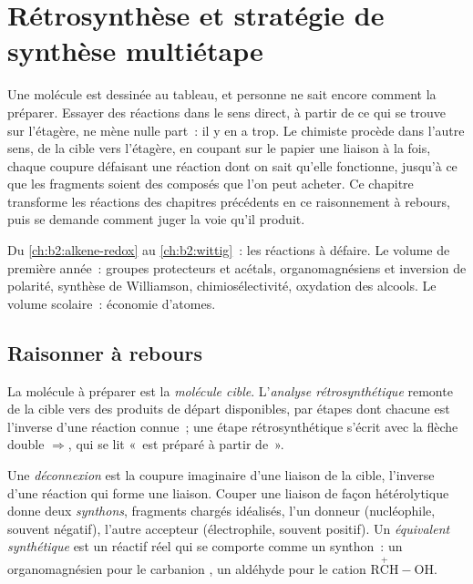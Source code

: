\chapter{Rétrosynthèse et stratégie de synthèse multiétape}\label{ch:b2:retrosynthesis}

Une molécule est dessinée au tableau, et personne ne sait encore comment la préparer. Essayer des
réactions dans le sens direct, à partir de ce qui se trouve sur l'étagère, ne mène nulle part~: il y en
a trop. Le chimiste procède dans l'autre sens, de la cible vers l'étagère, en coupant sur le papier une
liaison à la fois, chaque coupure défaisant une réaction dont on sait qu'elle fonctionne, jusqu'à ce que
les fragments soient des composés que l'on peut acheter. Ce chapitre transforme les réactions des
chapitres précédents en ce raisonnement à rebours, puis se demande comment juger la voie qu'il produit.

\begin{recall}
Du \cref{ch:b2:alkene-redox} au \cref{ch:b2:wittig}~: les réactions à défaire. Le volume de première
année~: groupes protecteurs et acétals, organomagnésiens et inversion de polarité, synthèse de
Williamson, chimiosélectivité, oxydation des alcools. Le volume scolaire~: économie d'atomes.
\end{recall}

\section{Raisonner à rebours}

\begin{definition}\label{def:b2:retrosynthesis:analysis}
La molécule à préparer est la \emph{molécule cible}. L'\emph{analyse
rétrosynthétique} remonte de la cible vers des
produits de départ disponibles,
par étapes dont chacune est l'inverse d'une réaction connue~; une étape rétrosynthétique s'écrit avec la
flèche double $\Rightarrow$, qui se lit «~est préparé à partir de~».
\end{definition}

\begin{definition}\label{def:b2:retrosynthesis:disconnection}
Une \emph{déconnexion} est la coupure imaginaire d'une liaison de la
cible, l'inverse d'une réaction qui forme une liaison. Couper une liaison de façon hétérolytique donne
deux \emph{synthons}, fragments chargés idéalisés, l'un donneur (nucléophile, souvent
négatif), l'autre accepteur (électrophile, souvent positif). Un \emph{équivalent synthétique}
est un réactif réel qui se comporte comme un synthon~: un organomagnésien pour le carbanion , un
aldéhyde pour le cation $\mathrm{R\overset{+}{C}H{-}OH}$.
\end{definition}

